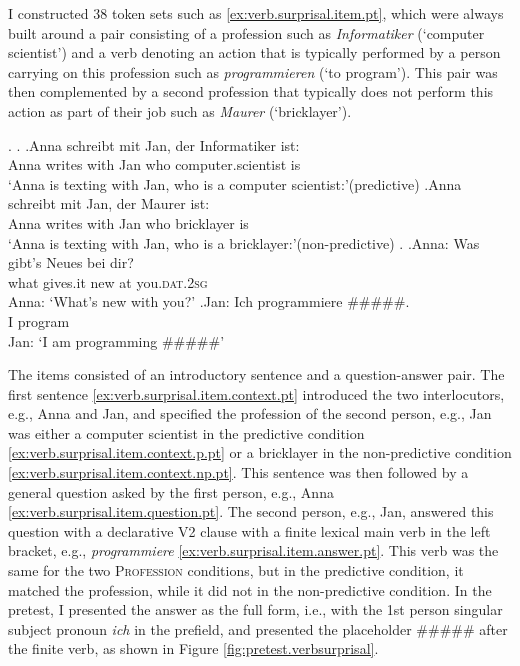 I constructed 38 token sets such as \ref{ex:verb.surprisal.item.pt}, which were always built around a pair consisting of a profession such as \textit{Informatiker} (`computer scientist') and a verb denoting an action that is typically performed by a person carrying on this profession such as \textit{programmieren} (`to program').
This pair was then complemented by a second profession that typically does not perform this action as part of their job such as \textit{Maurer} (`bricklayer').

\ex.\label{ex:verb.surprisal.item.pt}
\a.\label{ex:verb.surprisal.item.context.pt}
\ag.\label{ex:verb.surprisal.item.context.p.pt}Anna schreibt mit Jan, der Informatiker ist:\\
Anna writes with Jan who computer.scientist is\\
`Anna is texting with Jan, who is a computer scientist:'\hfill(predictive)
\bg.\label{ex:verb.surprisal.item.context.np.pt}Anna schreibt mit Jan, der Maurer ist:\\
Anna writes with Jan who bricklayer is\\
`Anna is texting with Jan, who is a bricklayer:'\hfill(non-predictive)
\z.
\bg.\label{ex:verb.surprisal.item.question.pt}Anna: Was gibt's Neues bei dir?\\
{} what gives.it new at you.\textsc{dat.2sg}\\
Anna: `What's new with you?'
\cg.\label{ex:verb.surprisal.item.answer.pt}Jan: Ich programmiere \#\#\#\#\#.\\
{} I program \\
Jan: `I am programming \#\#\#\#\#'

The items consisted of an introductory sentence and a question-answer pair.
The first sentence \ref{ex:verb.surprisal.item.context.pt} introduced the two interlocutors, e.g., Anna and Jan, and specified the profession of the second person, e.g., Jan was either a computer scientist in the predictive condition \ref{ex:verb.surprisal.item.context.p.pt} or a bricklayer in the non-predictive condition \ref{ex:verb.surprisal.item.context.np.pt}.
This sentence was then followed by a general question asked by the first person, e.g., Anna \ref{ex:verb.surprisal.item.question.pt}.
The second person, e.g., Jan, answered this question with a declarative V2 clause with a finite lexical main verb in the left bracket, e.g., \textit{programmiere} \ref{ex:verb.surprisal.item.answer.pt}.
This verb was the same for the two \textsc{Profession} conditions, but in the predictive condition, it matched the profession, while it did not in the non-predictive condition.
In the pretest, I presented the answer as the full form, i.e., with the 1st person singular subject pronoun \textit{ich} in the prefield, and  presented the placeholder \#\#\#\#\# after the finite verb, as shown in Figure \ref{fig:pretest.verbsurprisal}.

